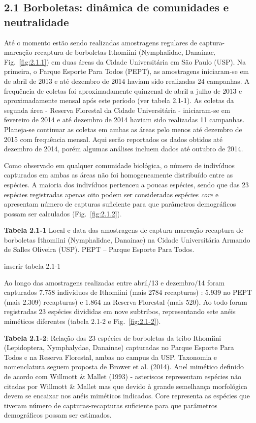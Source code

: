 \subsection{2.1 Borboletas: dinâmica de comunidades e neutralidade} %
\label{sec:dinamica-temporal-borb} 
Até o momento estão sendo realizadas amostragens regulares de
captura-marcação-recaptura de borboletas Ithomiini (Nymphalidae,
Danainae, Fig.~\ref{fig:2.1.1}) 
em duas áreas da Cidade Universitária em São Paulo (USP). Na
primeira, o Parque Esporte Para Todos (PEPT), as amostragens
iniciaram-se em de abril de 2013 e até dezembro de 2014 haviam sido
realizadas 24 campanhas. A frequência de coletas foi aproximadamente
quinzenal de abril a julho de 2013 e aproximadamente mensal após este
período (ver tabela 2.1-1). As coletas da segunda área - Reserva
Florestal da Cidade Universitária - iniciaram-se em fevereiro de 2014
e até dezembro de 2014 haviam sido realizadas 11 campanhas. Planeja-se
continuar as coletas em ambas as áreas pelo menos até dezembro de 2015
com frequência mensal. Aqui serão reportados os dados obtidos até
dezembro de 2014, porém algumas análises incluem dados até outubro de 2014.

Como observado em qualquer comunidade biológica, o número de
indivíduos capturados em ambas as áreas não foi homogeneamente
distribuído entre as espécies. A maioria dos indivíduos pertenceu a
poucas espécies, sendo que das 23 espécies registradas apenas oito
podem ser consideradas espécies \emph{core} e apresentam número de capturas
suficiente para que parâmetros demográficos possam ser calculados
(Fig.~\ref{fig:2.1.2}). 

\textbf{Tabela 2.1-1} Local e data das amostragens de
captura-marcação-recaptura de borboletas Ithomiini (Nymphalidae,
Danainae) na Cidade Universitária Armando de Salles Oliveira
(USP). PEPT – Parque Esporte Para Todos.

inserir tabela 2.1-1



Ao longo das amostragens realizadas entre abril/13 e dezembro/14 foram
capturados 7.758 indivíduos de Ithomiini (mais 2784 recapturas) : 5.939 no PEPT (mais 2.309) recapturas) e 1.864 na Reserva Florestal (mais 520). Ao todo foram registradas 23 espécies divididas em nove subtribos, representando sete anéis miméticos diferentes (tabela 2.1-2 e Fig.~\ref{fig:2.1-2}).

\textbf{Tabela 2.1-2}: Relação das 23 espécies de borboletas da tribo
Ithomiini (Lepidoptera, Nymphalydae, Danainae) capturadas no Parque
Esporte Para Todos e na Reserva Florestal, ambas no campus da
USP. Taxonomia e nomenclatura seguem proposta de Brower et
al. (2014). Anel mimético definido de acordo com Willmott \& Mallet
(1993) - asteriscos representam espécies não citadas por Willmott \&
Mallet mas que devido à grande semelhança morfológica devem se
encaixar nos anéis miméticos indicados. Core representa as espécies
que tiveram número de capturas-recapturas suficiente para que
parâmetros demográficos possam ser estimados.